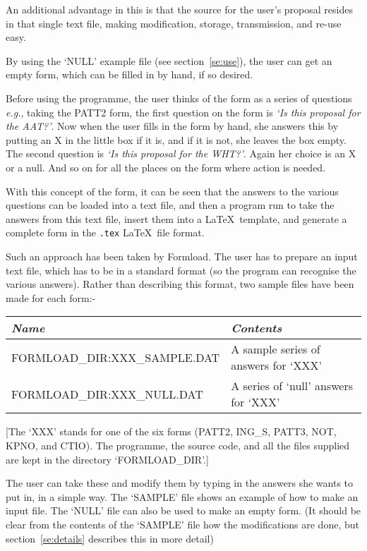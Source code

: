 An additional advantage in this is that the source for the user's proposal
resides in that single text file, making modification, storage,
transmission, and re-use easy. 

By using the `NULL' example file (see section~\ref{se:use}), the user can
get an empty form, which can be filled in by hand, if so desired. 

Before using the programme, the user thinks of the form as a series of
questions {\em e.g.}, taking the PATT2 form, the first question on the form
is {\it `Is this proposal for the AAT?'\/}. Now when the user fills in the
form by hand, she answers this by putting an X in the little box if it is,
and if it is not, she leaves the box empty. The second question is {\it `Is
this proposal for the WHT?'\/}. Again her choice is an X or a null. And so
on for all the places on the form where action is needed. 

With this concept of the form, it can be seen that the answers to the
various questions can be loaded into a text file, and then a program run to
take the answers from this text file, insert them into a \LaTeX\ template,
and generate a complete form in the {\tt .tex} \LaTeX\ file
format. 

Such an approach has been taken by Formload. The user has to prepare an
input text file, which has to be in a standard format (so the program can
recognise the various answers). Rather than describing this format, two
sample files have been made for each form:- 

\begin{center}
\begin{tabular}{|l|l|}\hline
{\it Name}                    & {\it Contents}                \\ \hline \hline
FORMLOAD\_DIR:XXX\_SAMPLE.DAT & A sample series of answers for `XXX' \\ \hline
FORMLOAD\_DIR:XXX\_NULL.DAT   & A series of `null' answers for `XXX' \\ \hline
\end{tabular}
\end{center}

[The `XXX' stands for one of the six forms (PATT2, ING\_S, PATT3, NOT,
KPNO, and CTIO). The programme, the source code, and all the files supplied
are kept in the directory `FORMLOAD\_DIR'.] 

The user can take these and modify them by typing in the answers she wants
to put in, in a simple way. The `SAMPLE' file shows an example of how to
make an input file. The `NULL' file can also be used to make an empty form.
(It should be clear from the contents of the `SAMPLE' file how the
modifications are done, but section~\ref{se:details} describes this in more
detail) 

